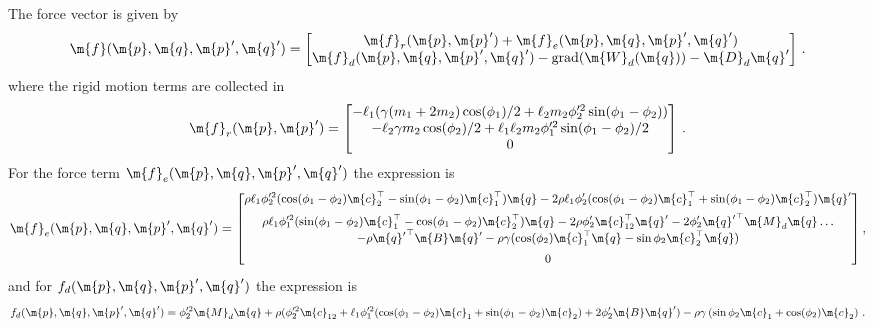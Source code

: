 %
The force vector is given by
%
\begin{equation}
  \m{f}(\m{p}, \m{q}, \m{p}^\prime, \m{q}^\prime) = \begin{bmatrix}
    \m{f}_r(\m{p}, \m{p}^\prime) + \m{f}_e(\m{p}, \m{q}, \m{p}^\prime, \m{q}^\prime) \\
    \m{f}_{d}(\m{p}, \m{q}, \m{p}^\prime, \m{q}^\prime) - \mathrm{grad}(\m{W}_{d}(\m{q})) - \m{D}_{d} \m{q}^\prime
  \end{bmatrix} \, \text{.}
\end{equation}
%
where the rigid motion terms are collected in
%
\begin{equation*}
  \m{f}_r(\m{p}, \m{p}^\prime) = \begin{bmatrix}
    -\ell_1(\gamma(m_1 + 2m_2) \cos(\phi_1)/2 + \ell_2 m_2 \phi_2^{\prime2} \sin(\phi_1 - \phi_2)) \\
    -\ell_2 \gamma m_2 \cos(\phi_2)/2 + \ell_1 \ell_2 m_2 \phi_1^{\prime2} \sin(\phi_1 - \phi_2)/2 \\
    0
  \end{bmatrix} \, \text{.}
\end{equation*}
%
For the force term $\m{f}_e(\m{p}, \m{q}, \m{p}^\prime, \m{q}^\prime)$ the expression is
%
\begin{equation*}
  \m{f}_e(\m{p}, \m{q}, \m{p}^\prime, \m{q}^\prime) = \small{\begin{bmatrix}
    \rho \ell_1 \phi_2^{\prime2}(\cos(\phi_1 - \phi_2)\m{c}_2^\top - \sin(\phi_1 - \phi_2)\m{c}_1^\top) \m{q}-2 \rho \ell_1 \phi_2^\prime(\cos(\phi_1 - \phi_2)\m{c}_1^\top + \sin(\phi_1 - \phi_2)\m{c}_2^\top) \m{q}^\prime \\[0.5em]
    \rho \ell_1 \phi_1^{\prime2}(\sin(\phi_1 - \phi_2)\m{c}_1^\top - \cos(\phi_1 - \phi_2)\m{c}_2^\top) \m{q}-2 \rho \phi_2^\prime \m{c}_{12}^\top \m{q}^\prime-2 \phi_2^\prime {\m{q}^\prime}^\top \m{M}_{d} \m{q} \dots\\
    -\rho {\m{q}^\prime}^\top \m{B} \m{q}^\prime - \rho \gamma(\cos(\phi_2) \m{c}_1^\top \m{q} - \sin \phi_2 \m{c}_2^\top \m{q}) \\[0.5em]
    0
\end{bmatrix}} \, \text{,}
\end{equation*}
%
and for $f_{d}(\m{p}, \m{q}, \m{p}^\prime, \m{q}^\prime)$ the expression is
%
\begin{equation*}
  f_{d}(\m{p}, \m{q}, \m{p}^\prime, \m{q}^\prime) = \phi_2^{\prime2} \m{M}_{d} \m{q}+\rho(\phi_2^{\prime2} \m{c}_{12}+\ell_1 \phi_1^{\prime2}(\cos(\phi_1 - \phi_2) \m{c}_1 + \sin(\phi_1 - \phi_2) \m{c}_2)+2 \phi_2^\prime \m{B} \m{q}^\prime)-\rho \gamma\left(\sin \phi_2 \m{c}_1+\cos(\phi_2) \m{c}_2\right) \, \text{.}
\end{equation*}

